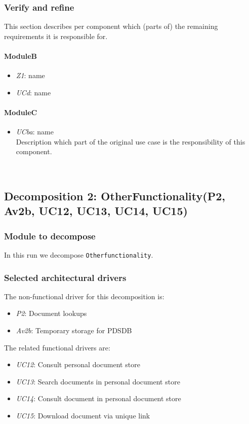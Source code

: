 \documentclass[a4paper,10pt]{article}
\begin{document}
\subsubsection{Verify and refine}
This section describes per component which (parts of) the remaining
requirements it is responsible for.

\paragraph{ModuleB}
\begin{itemize}
    \item \emph{Z1}: name
    \item \emph{UCd}: name
\end{itemize}

\paragraph{ModuleC}
\begin{itemize}
    \item \emph{UCba}: name\\Description which part of the original use case is
        the responsibility of this component.
\end{itemize}


\
\subsection{Decomposition 2: OtherFunctionality(P2, Av2b, UC12, UC13, UC14, UC15)}
\subsubsection{Module to decompose}
In this run we decompose \texttt{Otherfunctionality}.

\subsubsection{Selected architectural drivers}
The non-functional driver for this decomposition is:

\begin{itemize}
    \item \emph{P2}: Document lookups
    \item \emph{Av2b}: Temporary storage for PDSDB
\end{itemize}

The related functional drivers are:

\begin{itemize}
    \item \emph{UC12}: Consult personal document store
    \item \emph{UC13}: Search documents in personal document store
    \item \emph{UC14}: Consult document in personal document store
    \item \emph{UC15}: Download document via unique link
\end{itemize}
\end{document}
